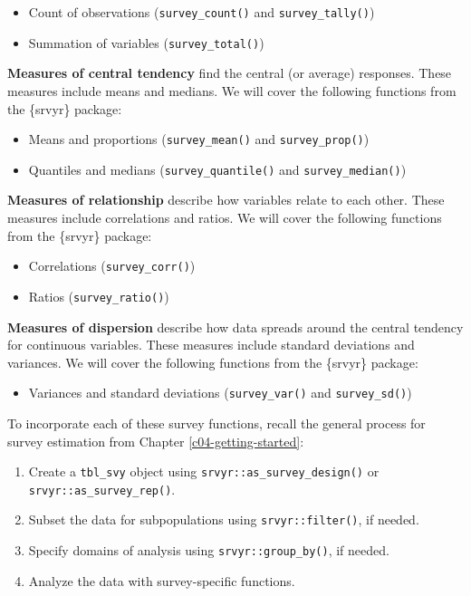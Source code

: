 \documentclass[
]{krantz}
\providecommand{\tightlist}{%
  \setlength{\itemsep}{0pt}\setlength{\parskip}{0pt}}
\begin{document}
\begin{itemize}
\tightlist
\item
  Count of observations (\texttt{survey\_count()} and \texttt{survey\_tally()})
\item
  Summation of variables (\texttt{survey\_total()})
\end{itemize}

\textbf{Measures of central tendency} find the central (or average) responses. These measures include means and medians. We will cover the following functions from the \{srvyr\} package:

\begin{itemize}
\tightlist
\item
  Means and proportions (\texttt{survey\_mean()} and \texttt{survey\_prop()})
\item
  Quantiles and medians (\texttt{survey\_quantile()} and \texttt{survey\_median()})
\end{itemize}

\textbf{Measures of relationship} describe how variables relate to each other. These measures include correlations and ratios. We will cover the following functions from the \{srvyr\} package:

\begin{itemize}
\tightlist
\item
  Correlations (\texttt{survey\_corr()})
\item
  Ratios (\texttt{survey\_ratio()})
\end{itemize}

\textbf{Measures of dispersion} describe how data spreads around the central tendency for continuous variables. These measures include standard deviations and variances. We will cover the following functions from the \{srvyr\} package:

\begin{itemize}
\tightlist
\item
  Variances and standard deviations (\texttt{survey\_var()} and \texttt{survey\_sd()})
\end{itemize}

To incorporate each of these survey functions, recall the general process for survey estimation from Chapter \ref{c04-getting-started}:

\begin{enumerate}
\def\labelenumi{\arabic{enumi}.}
\tightlist
\item
  Create a \texttt{tbl\_svy} object using \texttt{srvyr::as\_survey\_design()} or \texttt{srvyr::as\_survey\_rep()}.
\item
  Subset the data for subpopulations using \texttt{srvyr::filter()}, if needed.
\item
  Specify domains of analysis using \texttt{srvyr::group\_by()}, if needed.
\item
  Analyze the data with survey-specific functions.
\end{enumerate}
\end{document}
